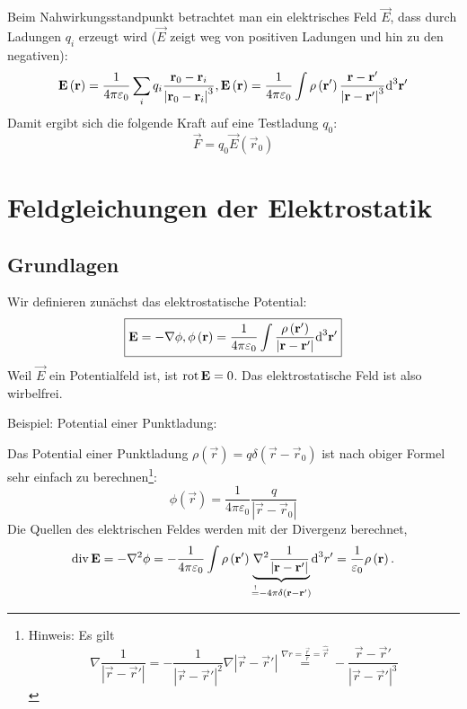 Beim Nahwirkungsstandpunkt betrachtet man ein elektrisches Feld $\vec {E}$, dass durch Ladungen $q_{i}$ erzeugt wird ($\vec {E}$ zeigt weg von positiven Ladungen und hin zu den negativen):
\begin{equation*}
	\mathbf{E}\left(\mathbf{r}\right)=\frac{1}{4\pi \varepsilon _{0}}\sum _{i}q_{i}\frac{\mathbf{r}_{0}-\mathbf{r}_{i}}{\left| \mathbf{r}_{0}-\mathbf{r}_{i}\right| ^{3}}, \mathbf{E}\left(\mathbf{r}\right)=\frac{1}{4\pi \varepsilon _{0}}\int \rho \left(\mathbf{r}'\right)\frac{\mathbf{r}-\mathbf{r}'}{\left| \mathbf{r}-\mathbf{r}'\right| ^{3}}\text{d} ^{3}\mathbf{r}'
\end{equation*}
Damit ergibt sich die folgende Kraft auf eine Testladung $q_{0}$:
\begin{equation*}
	\vec {F}=q_{0}\vec {E}\left(\vec {r}_{0}\right)
\end{equation*}
\section{Feldgleichungen der Elektrostatik\label{ref-018}}

\subsection{Grundlagen\label{ref-019}}

Wir definieren zunächst das elektrostatische Potential:
\begin{equation}
	\label{3.3}
	\boxed{\mathbf{E}=-\nabla \phi , \phi \left(\mathbf{r}\right)=\frac{1}{4\pi \varepsilon _{0}}\int \frac{\rho \left(\mathbf{r}'\right)}{\left| \mathbf{r}-\mathbf{r}'\right| }\text{d} ^{3}\mathbf{r}'}
\end{equation}
Weil $\vec {E}$ ein Potentialfeld ist, ist $\operatorname{rot} \mathbf{E}=0$. Das elektrostatische Feld ist also wirbelfrei.

Beispiel: Potential einer Punktladung:

Das Potential einer Punktladung $\rho \left(\vec {r}\right)=q\delta \left(\vec {r}-\vec {r}_{0}\right)$ ist nach obiger Formel sehr einfach zu berechnen\footnote{Hinweis: Es gilt
	\begin{equation*}
		\nabla \frac{1}{\left| \vec {r}-\vec {r}\mathrm{'}\right| }=-\frac{1}{\left| \vec {r}-\vec {r}\mathrm{'}\right| ^{2}}\nabla \left| \vec {r}-\vec {r}\mathrm{'}\right| \overset{\nabla r=\frac{\vec {r}}{r}=\hat{\vec {r}}}{=}-\frac{\vec {r}-\vec {r}\mathrm{'}}{\left| \vec {r}-\vec {r}\mathrm{'}\right| ^{3}}
	\end{equation*}
}:
\begin{equation*}
	\phi \left(\vec {r}\right)=\frac{1}{4\pi \varepsilon _{0}}\frac{q}{\left| \vec {r}-\vec {r}_{0}\right| }
\end{equation*}
Die Quellen des elektrischen Feldes werden mit der Divergenz berechnet,
\begin{equation*}
	\operatorname{div} \mathbf{E}=-\nabla ^{2}\phi =-\frac{1}{4\pi \varepsilon _{0}}\int \rho \left(\mathbf{r}\mathrm{'}\right)\underset{\overset{!}{=}-4\pi \delta \left(\mathbf{r}-\mathbf{r}\mathrm{'}\right)}{\underbrace{\nabla ^{2}\frac{1}{\left| \mathbf{r}-\mathbf{r}\mathrm{'}\right| }}}\text{d} ^{3}r\mathrm{'}=\frac{1}{\varepsilon _{0}}\rho \left(\mathbf{r}\right).
\end{equation*}
